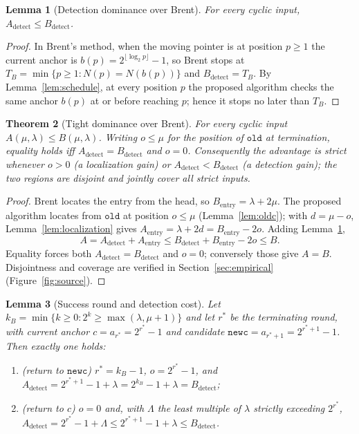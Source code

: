 \documentclass[11pt]{article}
\newtheorem{theorem}{Theorem}[section]
\newtheorem{lemma}[theorem]{Lemma}
\newcommand{\oldc}{\texttt{old}}
\newcommand{\newc}{\texttt{newc}}
\begin{document}
\begin{lemma}[Detection dominance over Brent]
\label{lem:brent-detect}
For every cyclic input, $A_{\mathrm{detect}}\le B_{\mathrm{detect}}$.
\end{lemma}

\begin{proof}
In Brent's method, when the moving pointer is at position $p\ge1$ the current
anchor is $b(p)=2^{\lfloor\log_2 p\rfloor}-1$, so Brent stops at
$T_B=\min\{p\ge1:N(p)=N(b(p))\}$ and $B_{\mathrm{detect}}=T_B$. By
Lemma~\ref{lem:schedule}, at every position $p$ the proposed algorithm checks the
same anchor $b(p)$ at or before reaching $p$; hence it stops no later than $T_B$.
\end{proof}

\begin{theorem}[Tight dominance over Brent]
\label{thm:brent}
For every cyclic input $A(\mu,\lambda)\le B(\mu,\lambda)$. Writing $o\le\mu$ for
the position of $\oldc$ at termination, equality holds iff
$A_{\mathrm{detect}}=B_{\mathrm{detect}}$ and $o=0$. Consequently the advantage is
strict whenever $o>0$ (a \emph{localization} gain) or
$A_{\mathrm{detect}}<B_{\mathrm{detect}}$ (a \emph{detection} gain); the two
regions are disjoint and jointly cover all strict inputs.
\end{theorem}

\begin{proof}
Brent locates the entry from the head, so $B_{\mathrm{entry}}=\lambda+2\mu$. The
proposed algorithm locates from $\oldc$ at position $o\le\mu$
(Lemma~\ref{lem:oldc}); with $d=\mu-o$, Lemma~\ref{lem:localization} gives
$A_{\mathrm{entry}}=\lambda+2d=B_{\mathrm{entry}}-2o$. Adding
Lemma~\ref{lem:brent-detect},
\[
A=A_{\mathrm{detect}}+A_{\mathrm{entry}}\le B_{\mathrm{detect}}+B_{\mathrm{entry}}-2o\le B.
\]
Equality forces both $A_{\mathrm{detect}}=B_{\mathrm{detect}}$ and $o=0$;
conversely those give $A=B$. Disjointness and coverage are verified in
Section~\ref{sec:empirical} (Figure~\ref{fig:source}).
\end{proof}

\begin{lemma}[Success round and detection cost]
\label{lem:success-round}
Let $k_B=\min\{k\ge 0:2^{k}\ge\max(\lambda,\mu+1)\}$ and let $r^{\ast}$ be the
terminating round, with current anchor $c=a_{r^{\ast}}=2^{r^{\ast}}-1$ and
candidate $\newc=a_{r^{\ast}+1}=2^{r^{\ast}+1}-1$. Then exactly one holds:
\begin{enumerate}[leftmargin=2.2em,label=\textup{(\roman*)}]
  \item \textup{(return to $\newc$)} $r^{\ast}=k_B-1$, $o=2^{r^{\ast}}-1$, and
        $A_{\mathrm{detect}}=2^{r^{\ast}+1}-1+\lambda=2^{k_B}-1+\lambda=B_{\mathrm{detect}}$;
  \item \textup{(return to $c$)} $o=0$ and, with $\Lambda$ the least multiple of
        $\lambda$ strictly exceeding $2^{r^{\ast}}$,
        $A_{\mathrm{detect}}=2^{r^{\ast}}-1+\Lambda\le 2^{r^{\ast}+1}-1+\lambda\le B_{\mathrm{detect}}$.
\end{enumerate}
\end{lemma}
\end{document}
